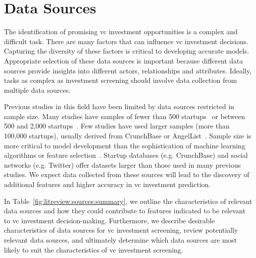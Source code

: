 \documentclass[../thesis/thesis.tex]{subfiles}
\begin{document}
\section{Data Sources}

The identification of promising \gls{vc} investment opportunities is a complex and difficult task. There are many factors that can influence \gls{vc} investment decisions. Capturing the diversity of these factors is critical to developing accurate models. Appropriate selection of these data sources is important because different data sources provide insights into different actors, relationships and attributes. Ideally, tasks as complex as investment screening should involve data collection from multiple data sources.

Previous studies in this field have been limited by data sources restricted in sample size. Many studies have samples of fewer than 500 startups~\cite{ahlers2015, gimmon2010} or between 500 and 2,000 startups~\cite{hoenen2014, yu2015, an2015, werth2013, croce2016}. Few studies have used larger samples (more than 100,000 startups), usually derived from CrunchBase or AngelList~\cite{shan2014, cheng2016}. Sample size is more critical to model development than the sophistication of machine learning algorithms or feature selection~\cite{caruana2008}. Startup databases (e.g. CrunchBase) and social networks (e.g. Twitter) offer datasets larger than those used in many previous studies. We expect data collected from these sources will lead to the discovery of additional features and higher accuracy in \gls{vc} investment prediction.

In Table~\ref{fig:litreview:sources:summary}, we outline the characteristics of relevant data sources and how they could contribute to features indicated to be relevant to \gls{vc} investment decision-making. Furthermore, we describe desirable characteristics of data sources for \gls{vc} investment screening, review potentially relevant data sources, and ultimately determine which data sources are most likely to suit the characteristics of \gls{vc} investment screening.

\end{document}
